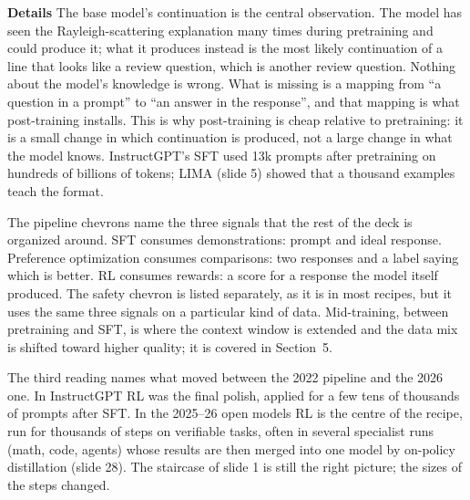 \documentclass[11pt,letterpaper]{article}
\newcommand{\para}[1]{\medskip\noindent\textbf{#1}\quad}
\begin{document}
\para{Details} The base model's continuation is the central observation. The model has seen the Rayleigh-scattering explanation many times during pretraining and could produce it; what it produces instead is the most likely continuation of a line that looks like a review question, which is another review question. Nothing about the model's knowledge is wrong. What is missing is a mapping from ``a question in a prompt'' to ``an answer in the response'', and that mapping is what post-training installs. This is why post-training is cheap relative to pretraining: it is a small change in which continuation is produced, not a large change in what the model knows. InstructGPT's SFT used 13k prompts after pretraining on hundreds of billions of tokens; LIMA (slide 5) showed that a thousand examples teach the format.

The pipeline chevrons name the three signals that the rest of the deck is organized around. SFT consumes demonstrations: prompt and ideal response. Preference optimization consumes comparisons: two responses and a label saying which is better. RL consumes rewards: a score for a response the model itself produced. The safety chevron is listed separately, as it is in most recipes, but it uses the same three signals on a particular kind of data. Mid-training, between pretraining and SFT, is where the context window is extended and the data mix is shifted toward higher quality; it is covered in Section~5.

The third reading names what moved between the 2022 pipeline and the 2026 one. In InstructGPT RL was the final polish, applied for a few tens of thousands of prompts after SFT. In the 2025--26 open models RL is the centre of the recipe, run for thousands of steps on verifiable tasks, often in several specialist runs (math, code, agents) whose results are then merged into one model by on-policy distillation (slide 28). The staircase of slide 1 is still the right picture; the sizes of the steps changed.
\end{document}
